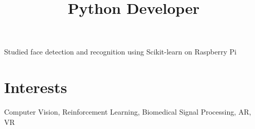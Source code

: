 \documentclass[margin]{res}
\begin{document}
\begin{resume}
      \title{\textbf{Python Developer}}
      \begin{position}
        Studied face detection and recognition using Scikit-learn on Raspberry Pi
      \end{position}

    \section{Interests}
      Computer Vision, Reinforcement Learning, Biomedical Signal Processing, AR, VR
  \end{resume}
\end{document}
